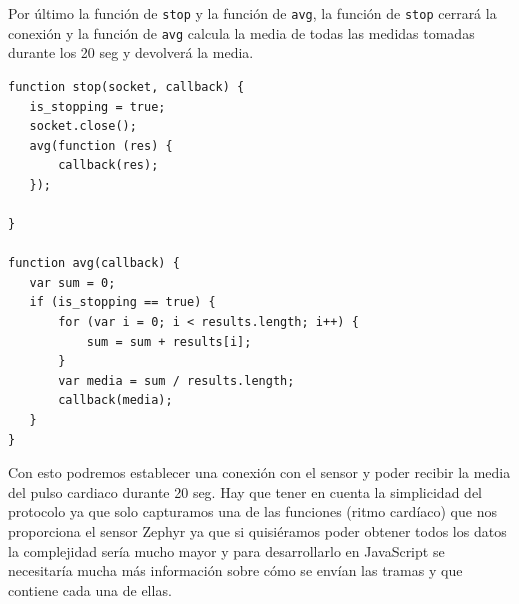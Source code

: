 Por último la función de \texttt{stop} y la función de \texttt{avg}, la función de \texttt{stop} cerrará la conexión y la función de \texttt{avg} calcula la media de todas las medidas tomadas durante los 20 seg y devolverá la media. 

\begin{verbatim}
function stop(socket, callback) {
   is_stopping = true;
   socket.close();
   avg(function (res) {
       callback(res);
   });

}

function avg(callback) {
   var sum = 0;
   if (is_stopping == true) {
       for (var i = 0; i < results.length; i++) {
           sum = sum + results[i];
       }
       var media = sum / results.length;
       callback(media);
   }
}
\end{verbatim}

Con esto podremos establecer una conexión con el sensor y poder recibir la media del pulso cardiaco durante 20 seg. Hay que tener en cuenta la simplicidad del protocolo ya que solo capturamos una de las funciones (ritmo cardíaco) que nos proporciona el sensor Zephyr ya que si quisiéramos poder obtener todos los datos la complejidad sería mucho mayor y para desarrollarlo en JavaScript se necesitaría mucha más información sobre cómo se envían las tramas y que contiene cada una de ellas. 